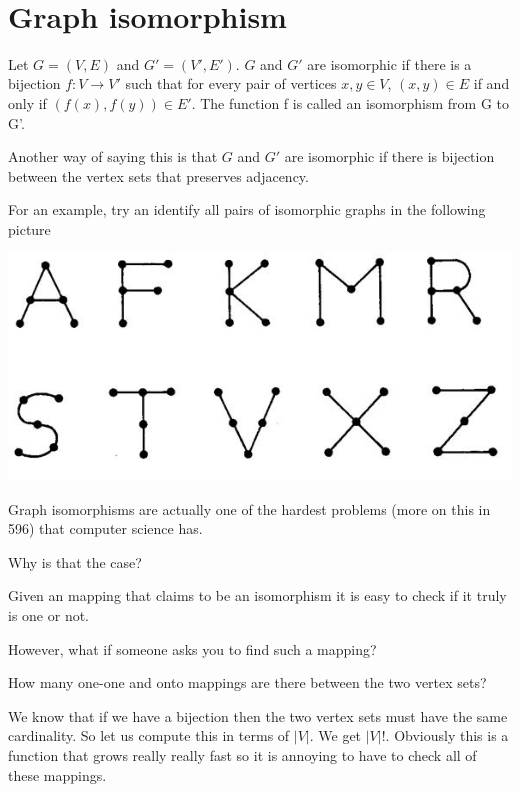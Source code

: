 \documentclass[12pt]{article}
\begin{document}
\begin{center}
\\
\vspace{1cm}
\end{center}

\vspace{0.5cm}\noindent


\section*{Graph isomorphism}

Let $G = (V, E)$ and $G'=(V',E')$. $G$ and $G'$ are isomorphic if there is a bijection $f: V \rightarrow V'$ such that for every pair of vertices $x, y \in V$, $(x, y) \in E$ if and only if $(f(x), f(y)) \in E'$. The function f is called an isomorphism from G to G'. 

\medskip

Another way of saying this is that $G$ and $G'$ are isomorphic if there is bijection between the vertex sets that preserves adjacency.

For an example, try an identify all pairs of isomorphic graphs in the following picture


\includegraphics[scale=0.6]{./img/iso.jpg}

Graph isomorphisms are actually one of the hardest problems (more on this in 596) that computer science has.

Why is that the case?

Given an mapping that claims to be an isomorphism it is easy to check if it truly is one or not.

However, what if someone asks you to find such a mapping?

How many one-one and onto mappings are there between the two vertex sets? 

We know that if we have a bijection then the two vertex sets must have the same cardinality. So let us compute this in terms of $|V|$. We get $|V|!$. Obviously this is a function that grows really really fast so it is annoying to have to check all of these mappings.
\end{document}
